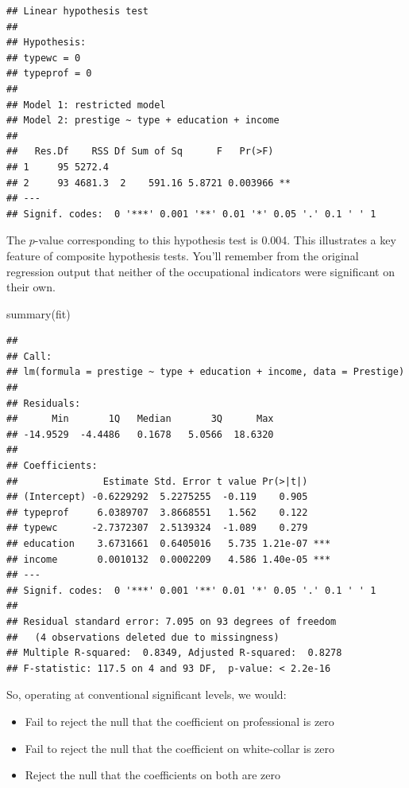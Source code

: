 \documentclass[
  12pt,
  oneside,openany]{book}
\newenvironment{Shaded}{\begin{snugshade}}{\end{snugshade}}
\newcommand{\FunctionTok}[1]{\textcolor[rgb]{0.00,0.00,0.00}{#1}}
\newcommand{\NormalTok}[1]{#1}
\providecommand{\tightlist}{%
  \setlength{\itemsep}{0pt}\setlength{\parskip}{0pt}}
\begin{document}
\begin{verbatim}
## Linear hypothesis test
## 
## Hypothesis:
## typewc = 0
## typeprof = 0
## 
## Model 1: restricted model
## Model 2: prestige ~ type + education + income
## 
##   Res.Df    RSS Df Sum of Sq      F   Pr(>F)   
## 1     95 5272.4                                
## 2     93 4681.3  2    591.16 5.8721 0.003966 **
## ---
## Signif. codes:  0 '***' 0.001 '**' 0.01 '*' 0.05 '.' 0.1 ' ' 1
\end{verbatim}

The \(p\)-value corresponding to this hypothesis test is 0.004. This illustrates a key feature of composite hypothesis tests. You'll remember from the original regression output that neither of the occupational indicators were significant on their own.

\begin{Shaded}
\begin{Highlighting}[]
\FunctionTok{summary}\NormalTok{(fit)}
\end{Highlighting}
\end{Shaded}

\begin{verbatim}
## 
## Call:
## lm(formula = prestige ~ type + education + income, data = Prestige)
## 
## Residuals:
##      Min       1Q   Median       3Q      Max 
## -14.9529  -4.4486   0.1678   5.0566  18.6320 
## 
## Coefficients:
##               Estimate Std. Error t value Pr(>|t|)    
## (Intercept) -0.6229292  5.2275255  -0.119    0.905    
## typeprof     6.0389707  3.8668551   1.562    0.122    
## typewc      -2.7372307  2.5139324  -1.089    0.279    
## education    3.6731661  0.6405016   5.735 1.21e-07 ***
## income       0.0010132  0.0002209   4.586 1.40e-05 ***
## ---
## Signif. codes:  0 '***' 0.001 '**' 0.01 '*' 0.05 '.' 0.1 ' ' 1
## 
## Residual standard error: 7.095 on 93 degrees of freedom
##   (4 observations deleted due to missingness)
## Multiple R-squared:  0.8349, Adjusted R-squared:  0.8278 
## F-statistic: 117.5 on 4 and 93 DF,  p-value: < 2.2e-16
\end{verbatim}

So, operating at conventional significant levels, we would:

\begin{itemize}
\tightlist
\item
  Fail to reject the null that the coefficient on professional is zero
\item
  Fail to reject the null that the coefficient on white-collar is zero
\item
  Reject the null that the coefficients on both are zero
\end{itemize}
\end{document}
